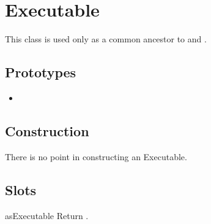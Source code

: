 
\section{Executable}

This class is used only as a common ancestor to 
and .

\subsection{Prototypes}
\begin{itemize}
\item {}
\end{itemize}

\subsection{Construction}

There is no point in constructing an Executable.

\subsection{Slots}

\begin{urbiscriptapi}
\item[asExecutable] Return \this.
\end{urbiscriptapi}


